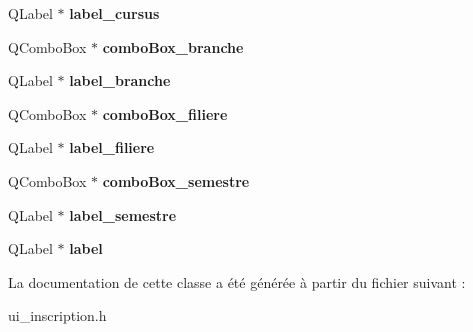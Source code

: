 \begin{DoxyCompactItemize}
\item 
\hypertarget{class_ui___inscription_a78d434455289bba5e01201f2f5603cf6}{Q\+Label $\ast$ {\bfseries label\+\_\+cursus}}\label{class_ui___inscription_a78d434455289bba5e01201f2f5603cf6}

\item 
\hypertarget{class_ui___inscription_af948b1cbf1fdeceb025142a7d9d30c3f}{Q\+Combo\+Box $\ast$ {\bfseries combo\+Box\+\_\+branche}}\label{class_ui___inscription_af948b1cbf1fdeceb025142a7d9d30c3f}

\item 
\hypertarget{class_ui___inscription_a82434ae5620ed068723a5af25b48788f}{Q\+Label $\ast$ {\bfseries label\+\_\+branche}}\label{class_ui___inscription_a82434ae5620ed068723a5af25b48788f}

\item 
\hypertarget{class_ui___inscription_a76755d83bd82d04da3b0ac4f528f58b1}{Q\+Combo\+Box $\ast$ {\bfseries combo\+Box\+\_\+filiere}}\label{class_ui___inscription_a76755d83bd82d04da3b0ac4f528f58b1}

\item 
\hypertarget{class_ui___inscription_a8352af532dd880915bdffee680950cb3}{Q\+Label $\ast$ {\bfseries label\+\_\+filiere}}\label{class_ui___inscription_a8352af532dd880915bdffee680950cb3}

\item 
\hypertarget{class_ui___inscription_a8c3f31f68f307b7827f7653c99cbe155}{Q\+Combo\+Box $\ast$ {\bfseries combo\+Box\+\_\+semestre}}\label{class_ui___inscription_a8c3f31f68f307b7827f7653c99cbe155}

\item 
\hypertarget{class_ui___inscription_a7644a994ad9a3f36bb739f298ce4970f}{Q\+Label $\ast$ {\bfseries label\+\_\+semestre}}\label{class_ui___inscription_a7644a994ad9a3f36bb739f298ce4970f}

\item 
\hypertarget{class_ui___inscription_a0e0cb171f2ff3b36dd00357e064a0109}{Q\+Label $\ast$ {\bfseries label}}\label{class_ui___inscription_a0e0cb171f2ff3b36dd00357e064a0109}

\end{DoxyCompactItemize}


La documentation de cette classe a été générée à partir du fichier suivant \+:\begin{DoxyCompactItemize}
\item 
ui\+\_\+inscription.\+h\end{DoxyCompactItemize}
